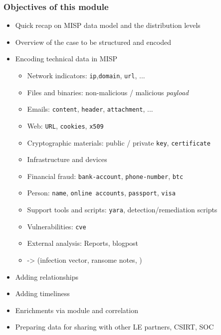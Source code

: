 
\begin{frame}[t,plain]
\titlepage
\end{frame}

\begin{frame}
    \frametitle{Objectives of this module}
    \begin{itemize}
        \item Quick recap on MISP data model and the distribution levels
        \item Overview of the case to be structured and encoded
        \item Encoding technical data in MISP
        \begin{itemize}
            \item Network indicators: \texttt{ip},\texttt{domain}, \texttt{url}, ...
            \item Files and binaries: non-malicious / malicious \textit{payload}
            \item Emails: \texttt{content}, \texttt{header}, \texttt{attachment}, ...
            \item Web: \texttt{URL}, \texttt{cookies}, \texttt{x509}
            \item Cryptographic materials: public / private \texttt{key}, \texttt{certificate}
            \item Infrastructure and devices
            \item Financial fraud: \texttt{bank-account}, \texttt{phone-number}, \texttt{btc}
            \item Person: \texttt{name}, \texttt{online accounts}, \texttt{passport}, \texttt{visa}
            \item Support tools and scripts: \texttt{yara}, detection/remediation scripts
            \item Vulnerabilities: \texttt{cve}
            \item External analysis: Reports, blogpost
            \item -> (infection vector, ransome notes, )
        \end{itemize}
        \item Adding relationships
        \item Adding timeliness
        \item Enrichments via module and correlation
        \item Preparing data for sharing with other LE partners, CSIRT, SOC
    \end{itemize}
\end{frame}
